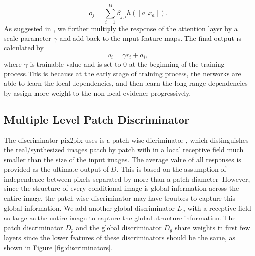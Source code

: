 \begin{equation}
\label{eqn:response}
o_j=\sum^M_{i=1}\beta_{j,i}h([a, x_a]).
\end{equation}
As suggested in \cite{SAGANs}, we further multiply the response of the attention layer by a scale parameter $\gamma$ and add back to the input feature maps. The final output is calculated by 
\begin{equation}
\label{eqn:output}
o_i=\gamma r_i+a_i,
\end{equation}
where $\gamma$ is trainable value and is set to $0$ at the beginning of the training process.This is because at the early stage of training process, the networks are able to learn the local dependencies, and then learn the long-range dependencies by assign more weight to the non-local evidence progressively.
%
%
\subsection{Multiple Level Patch Discriminator}
The discriminator pix2pix uses is a patch-wise dicriminator \cite{PatchGANs}, which distinguishes the real/synthesized images patch by patch with in a local receptive field much smaller than the size of the input images. 
The average value of all responses is provided as the ultimate output of $D$. 
This is based on the assumption of independence between pixels separated by more than a patch diameter. 
However, since the structure of every conditional image is global information across the entire image, the patch-wise discriminator may have troubles to capture this global information.
We add another global discriminator $D_g$ with a receptive field as large as the entire image to capture the global structure information. The patch discriminator $D_p$ and the global discriminator $D_g$ share weights in first few layers since the lower features of these discriminators should be the same, as shown in Figure \ref{fig:discriminators}.
%
%
